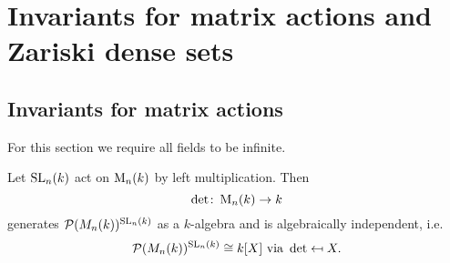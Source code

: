 \chapter{Invariants for matrix actions and Zariski dense sets}





\section{Invariants for matrix actions}
For this section we require all fields to be infinite.


\begin{thrm}
  Let $\operatorname{SL}_n(k)$ act on $\operatorname{M}_n(k)$ by left multiplication. Then
  \[
            \det
    \colon  \operatorname{M}_n(k)
    \to     k
  \]
  generates $\mathcal{P}(M_n(k))^{\operatorname{SL}_n(k)}$ as a $k$-algebra and is algebraically independent, i.e.\
  \[
              \mathcal{P}(M_n(k))^{\operatorname{SL}_n(k)}
    \cong     k[X]
    \text{ via }
              \det
    \mapsfrom X.
  \]
\end{thrm}

